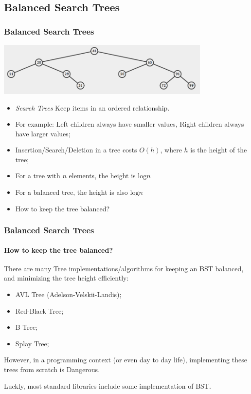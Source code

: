 \documentclass{beamer}
\begin{document}
\subsection{Balanced Search Trees}

\begin{frame}
  \frametitle{Balanced Search Trees}
  \begin{center}
    \includegraphics[width=0.8\textwidth]{img/BST}
  \end{center}
  \begin{itemize}
  \item \emph{Search Trees} Keep items in an ordered relationship.
  \item For example: Left children always have smaller values, Right
    children always have larger values;
  \item Insertion/Search/Deletion in a tree costs $O(h)$, where $h$ is
    the height of the tree;
  \item For a tree with $n$ elements, the  height
    is $\text{log}n$
  \item For a balanced tree, the  height is also
    $\text{log}n$
  \item How to keep the tree balanced?
  \end{itemize}
\end{frame}

\begin{frame}
  \frametitle{Balanced Search Trees}
  \framesubtitle{How to keep the tree balanced?}

  There are many Tree implementations/algorithms for keeping an BST
  balanced, and minimizing the tree height efficiently:
  \begin{itemize}
  \item AVL Tree (Adelson-Velskii-Landis);
  \item Red-Black Tree;
  \item B-Tree;
  \item Splay Tree;
  \end{itemize}
  \bigskip

  However, in a programming context (or even day to day life),
  implementing these trees from scratch is \alert{Dangerous}.

  \bigskip

  Luckly, most standard libraries include some implementation of BST.
\end{frame}
\end{document}
